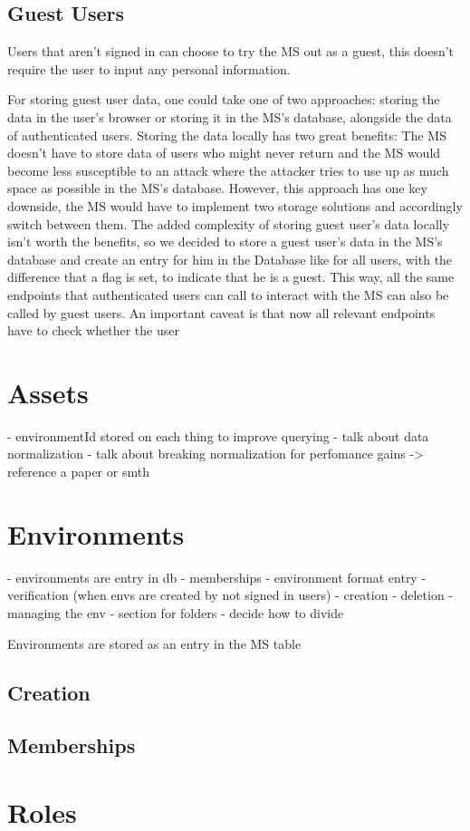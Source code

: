 \subsection{Guest Users}

Users that aren't signed in can choose to try the MS out as a guest, this doesn't require
the user to input any personal information.

For storing guest user data, one could take one of two approaches:
storing the data in the user's browser or storing it in the MS's database, alongside the
data of authenticated users.
Storing the data locally has two great benefits: 
The MS doesn't have to store data of users who might never return and
the MS would become less susceptible to an attack where the attacker tries to use up as
much space as possible in the MS's database.
However, this approach has one key downside, the MS would have to implement two storage
solutions and accordingly switch between them.
The added complexity of storing guest user's data locally isn't worth the benefits, so we
decided to store a guest user's data in the MS's database and create an entry for him in
the Database like for all users, with the difference that a flag is set, to indicate that
he is a guest.
This way, all the same endpoints that authenticated users can call to interact with the MS
can also be called by guest users.
An important caveat is that now all relevant endpoints have to check whether the user 


\section{Assets}

- environmentId stored on each thing to improve querying
- talk about data normalization
- talk about breaking normalization for perfomance gains -> reference a paper or smth

\section{Environments}

- environments are entry in db
- memberships
- environment format entry
- verification (when envs are created by not signed in users)
- creation
- deletion - managing the env
- section for folders
- decide how to divide 

Environments are stored as an entry in the MS table


\subsection{Creation}
\subsection{Memberships}

\section{Roles}


